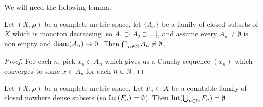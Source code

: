 

We will need the following lemma.

\begin{lemma}
Let $(X,\rho)$ be a complete metric space, let $\{A_{n}\}$ be a family
of closed subsets of $X$ which is monoton decreasing [so $A_{1}\supset A_{2}\supset\dots$],
and assume every $A_{n}\neq\emptyset$ is non empty and $\operatorname{diam}(A_{n})\to0$.
Then $\bigcap_{n\in\mathbb{N}}A_{n}\neq\emptyset$.
\end{lemma}

\begin{proof}
For each $n$, pick $x_{n}\in A_{n}$ which gives us a Cauchy sequence
$(x_{n})$ which converges to some $x\in A_{n}$ for each $n\in\mathbb{N}$.
\end{proof}

\begin{theorem}
Let $(X,\rho)$ be a complete metric space.
Let $F_{n}\subset X$ be a countable family of closed nowhere dense
subsets (so $\operatorname{Int}(F_{n})=\emptyset$).
Then $\operatorname{Int}(\bigcup_{n\in\mathbb{N}}F_{n})=\emptyset$.
\end{theorem}

